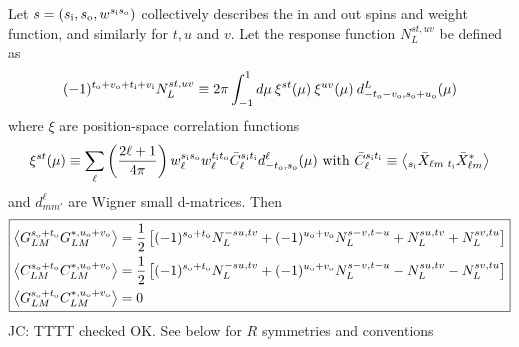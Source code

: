 \documentclass{article}
\newcommand{\si}[0]{{s_{\rm i}}}
\newcommand{\ti}[0]{{t_{\rm i}}}
\newcommand{\vi}[0]{{v_{\rm i}}}
\newcommand{\so}[0]{{s_{\rm o}}}
\renewcommand{\to}[0]{{t_{\rm o}}}
\newcommand{\uo}[0]{{u_{\rm o}}}
\newcommand{\vo}[0]{{v_{\rm o}}}
\newcommand{\av}[1]{\left\langle #1 \right\rangle}
\newcommand{\JC}[1]{\color{red}JC: #1\color{black}}
\begin{document}
Let $s = (\si, \so, w^{\si\so})$ collectively describes the in and out spins and weight function, and similarly for $t, u$ and $v$. Let the response function $N^{st, uv}_L$ be defined as
\begin{equation}
(-1)^{\to + \vo + \ti + \vi} N_L^{st,uv} \equiv 2\pi  \int_{-1}^1 d \mu \:\xi^{st}(\mu)\:\xi^{uv}(\mu)\: d^L_{-\to - \vo, \so + \uo}(\mu) 
\end{equation}
where $\xi$ are position-space correlation functions
\begin{equation}
\xi^{st}(\mu) \equiv  \sum_\ell \left(\frac{2\ell + 1}{4\pi}\right)w^{\si\so}_\ell w^{\ti\to}_\ell \bar C_\ell^{\si \ti} d^\ell_{-\to,\so}(\mu)\textrm{ with } \bar C_\ell^{\si \ti} \equiv \av{ _{\si}\bar X_{\ell m}\: _{\ti} \bar X^*_{\ell m} }
\end{equation}
and $d^\ell_{mm'}$ are Wigner small d-matrices.
Then
\begin{equation} \boxed{
\begin{split}
\av{G^{\so + \to}_{LM} G^{*, \uo + \vo}_{L M} } &= \frac 12\left[ (-1)^{\so + \to} N^{-su, tv}_L + (-1)^{\uo + \vo} N_L^{s-v, t-u}+N^{su, tv}_L  + N^{sv, tu}_L \right] \\
		\av{C^{\so + \to}_{LM} C^{*, \uo + \vo}_{L M} } &= \frac 12\left[ (-1)^{\so + \to} N^{-su, tv}_L + (-1)^{\uo + \vo} N_L^{s-v, t-u}-N^{su, tv}_L  - N^{sv, tu}_L \right] \\
	\av{G^{\so + \to}_{LM} C^{*, \uo + \vo}_{L M} } &=0
\end{split}}
\end{equation}
\JC{TTTT checked OK. See below for $R$ symmetries and conventions}
\end{document}
